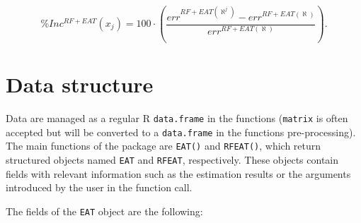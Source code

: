 \begin{equation} \label{(9)} 
\% Inc^{RF+EAT} \left(x_{j} \right)=100\cdot \left(\frac{err^{RF+EAT\left(\aleph ^{j} \right)} -err^{RF+EAT\left(\aleph \right)} }{err^{RF+EAT\left(\aleph \right)}} \right). 
\end{equation}

\hypertarget{section3}{%
\section{Data structure}\label{section3}}

Data are managed as a regular R \texttt{data.frame} in the 
functions (\texttt{matrix} is often accepted but will be converted to a
\texttt{data.frame} in the functions pre-processing). The main functions
of the  package are \texttt{EAT()} and \texttt{RFEAT()}, which
return structured objects named \texttt{EAT} and \texttt{RFEAT},
respectively. These objects contain fields with relevant information
such as the estimation results or the arguments introduced by the user
in the function call.

The fields of the \texttt{EAT} object are the following:

